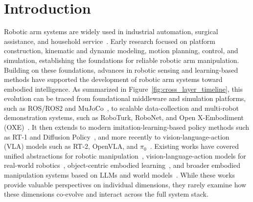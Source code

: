 \documentclass[acmsmall,screen,review]{acmart}
\begin{document}


\maketitle

\section{Introduction}\label{sec:introduction}
Robotic arm systems are widely used in industrial automation, surgical assistance, and household service~\cite{liu2024okrobot,long2025surgicalembodied,schoonbeek2024industreal}.
Early research focused on platform construction, kinematic and dynamic modeling, motion planning, control, and simulation, establishing the foundations for reliable robotic arm manipulation.
Building on these foundations, advances in robotic sensing and learning-based methods have supported the development of robotic arm systems toward embodied intelligence.
As summarized in Figure~\ref{fig:cross_layer_timeline}, this evolution can be traced from foundational middleware and simulation platforms, such as ROS/ROS2 and MuJoCo~\cite{macenski2022robot,todorov2012mujoco}, to scalable data-collection and multi-robot demonstration systems, such as RoboTurk, RoboNet, and Open X-Embodiment (OXE)~\cite{mandlekar2018roboturk,dasari2020robonet,padalkar2023open}.
It then extends to modern imitation-learning-based policy methods such as RT-1 and Diffusion Policy~\cite{brohan2023rt1,chi2023diffusion}, and more recently to vision-language-action (VLA) models such as RT-2, OpenVLA, and $\pi_0$~\cite{brohan2023rt2,kim2024openvla,black2024pi0}.
Existing works have covered unified abstractions for robotic manipulation~\cite{baiUnifiedUnderstandingRobot2025}, vision-language-action models for real-world robotics~\cite{kawaharazukaVisionLanguageActionModelsRobotics2025}, object-centric embodied learning~\cite{survey2025objectcentric}, and broader embodied manipulation systems based on LLMs and world models~\cite{liuEmbodiedIntelligenceSynergy2025}. 
While these works provide valuable perspectives on individual dimensions, they rarely examine how these dimensions co-evolve and interact across the full system stack.
\end{document}

